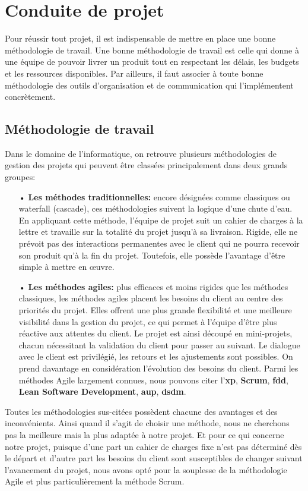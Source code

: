 \section{Conduite de projet}
Pour réussir tout projet, il est indispensable de mettre en place une bonne méthodologie de travail. Une bonne méthodologie de travail est celle qui donne à une équipe de pouvoir livrer un produit tout en respectant les délais, les budgets et les ressources disponibles. Par ailleurs, il faut associer à toute bonne méthodologie des outils d'organisation et de communication qui l'implémentent concrètement.
    \subsection{Méthodologie de travail}
    Dans le domaine de l’informatique, on retrouve plusieurs méthodologies de gestion des projets qui peuvent être classées principalement dans deux grands groupes:
        \begin{itemize}
            \item[•] \textbf{Les méthodes traditionnelles: }encore désignées comme classiques ou waterfall (cascade), ces méthodologies suivent la logique d’une chute d’eau. En appliquant cette méthode, l’équipe de projet suit un cahier de charges à la lettre et travaille sur la totalité du projet jusqu’à sa livraison. Rigide, elle ne prévoit pas des interactions permanentes avec le client qui ne pourra recevoir son produit qu’à la fin du projet. Toutefois, elle possède l’avantage d’être simple à mettre en œuvre.
            \item[•] \textbf{Les méthodes agiles: }plus efficaces et moins rigides que les méthodes classiques, les méthodes agiles placent les besoins du client au centre des priorités du projet. Elles offrent une plus grande flexibilité et une meilleure visibilité dans la gestion du projet, ce qui permet à l'équipe d'être plus réactive aux attentes du client. Le projet est ainsi découpé en mini-projets, chacun nécessitant la validation du client pour passer au suivant. Le dialogue avec le client est privilégié, les retours et les ajustements sont possibles. On prend davantage en considération l'évolution des besoins du client. Parmi les méthodes Agile largement connues, nous pouvons citer l'\textbf{\acrfull{xp}},
            \textbf{Scrum}, \textbf{\acrfull{fdd}}, \textbf{Lean Software Development}, \textbf{\acrfull{aup}}, \textbf{\acrfull{dsdm}}.
        \end{itemize}

        Toutes les méthodologies sus-citées possèdent chacune des avantages et des inconvénients. Ainsi quand il s’agit de choisir une méthode, nous ne cherchons pas la meilleure mais la plus adaptée à notre projet. Et pour ce qui concerne notre projet, puisque d’une part un cahier de charges fixe n’est pas déterminé dès le départ et d’autre part les besoins du client sont susceptibles de changer suivant l’avancement du projet, nous avons opté pour la souplesse de la méthodologie Agile et plus particulièrement la méthode Scrum.
        
